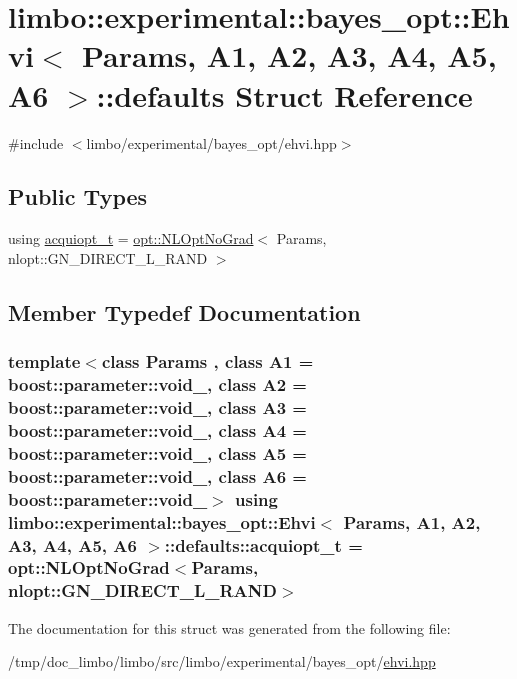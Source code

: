 \hypertarget{structlimbo_1_1experimental_1_1bayes__opt_1_1_ehvi_1_1defaults}{}\section{limbo\+:\+:experimental\+:\+:bayes\+\_\+opt\+:\+:Ehvi$<$ Params, A1, A2, A3, A4, A5, A6 $>$\+:\+:defaults Struct Reference}
\label{structlimbo_1_1experimental_1_1bayes__opt_1_1_ehvi_1_1defaults}


{\ttfamily \#include $<$limbo/experimental/bayes\+\_\+opt/ehvi.\+hpp$>$}

\subsection*{Public Types}
\begin{DoxyCompactItemize}
\item 
using \hyperlink{structlimbo_1_1experimental_1_1bayes__opt_1_1_ehvi_1_1defaults_aa57e9da768ea83c6b467b8e9f31da835}{acquiopt\+\_\+t} = \hyperlink{structlimbo_1_1opt_1_1_n_l_opt_no_grad}{opt\+::\+N\+L\+Opt\+No\+Grad}$<$ Params, nlopt\+::\+G\+N\+\_\+\+D\+I\+R\+E\+C\+T\+\_\+\+L\+\_\+\+R\+A\+N\+D $>$
\end{DoxyCompactItemize}


\subsection{Member Typedef Documentation}
\hypertarget{structlimbo_1_1experimental_1_1bayes__opt_1_1_ehvi_1_1defaults_aa57e9da768ea83c6b467b8e9f31da835}{}
\subsubsection[{acquiopt\+\_\+t}]{\setlength{\rightskip}{0pt plus 5cm}template$<$class Params , class A1  = boost\+::parameter\+::void\+\_\+, class A2  = boost\+::parameter\+::void\+\_\+, class A3  = boost\+::parameter\+::void\+\_\+, class A4  = boost\+::parameter\+::void\+\_\+, class A5  = boost\+::parameter\+::void\+\_\+, class A6  = boost\+::parameter\+::void\+\_\+$>$ using {\bf limbo\+::experimental\+::bayes\+\_\+opt\+::\+Ehvi}$<$ Params, A1, A2, A3, A4, A5, A6 $>$\+::{\bf defaults\+::acquiopt\+\_\+t} =  {\bf opt\+::\+N\+L\+Opt\+No\+Grad}$<$Params, nlopt\+::\+G\+N\+\_\+\+D\+I\+R\+E\+C\+T\+\_\+\+L\+\_\+\+R\+A\+N\+D$>$}\label{structlimbo_1_1experimental_1_1bayes__opt_1_1_ehvi_1_1defaults_aa57e9da768ea83c6b467b8e9f31da835}


The documentation for this struct was generated from the following file\+:\begin{DoxyCompactItemize}
\item 
/tmp/doc\+\_\+limbo/limbo/src/limbo/experimental/bayes\+\_\+opt/\hyperlink{bayes__opt_2ehvi_8hpp}{ehvi.\+hpp}\end{DoxyCompactItemize}
